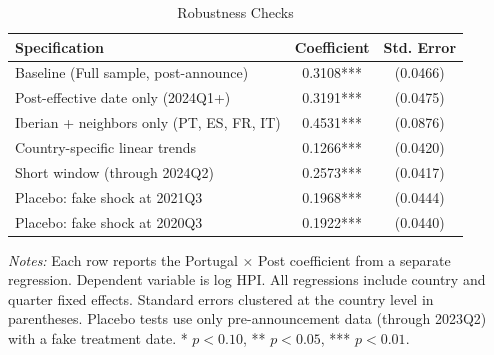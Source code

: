 \begin{table}[H]
\centering
\caption{Robustness Checks}
\begin{threeparttable}
\begin{tabular}{lcc}
\toprule
Specification & Coefficient & Std. Error \\
\midrule
Baseline (Full sample, post-announce) & 0.3108*** & (0.0466) \\
Post-effective date only (2024Q1+) & 0.3191*** & (0.0475) \\
Iberian + neighbors only (PT, ES, FR, IT) & 0.4531*** & (0.0876) \\
Country-specific linear trends & 0.1266*** & (0.0420) \\
Short window (through 2024Q2) & 0.2573*** & (0.0417) \\
Placebo: fake shock at 2021Q3 & 0.1968*** & (0.0444) \\
Placebo: fake shock at 2020Q3 & 0.1922*** & (0.0440) \\
\bottomrule
\end{tabular}
\begin{tablenotes}[flushleft]
\small
\item \textit{Notes:} Each row reports the Portugal $\times$ Post coefficient from a separate regression. Dependent variable is log HPI. All regressions include country and quarter fixed effects. Standard errors clustered at the country level in parentheses. Placebo tests use only pre-announcement data (through 2023Q2) with a fake treatment date. * $p<0.10$, ** $p<0.05$, *** $p<0.01$.
\end{tablenotes}
\end{threeparttable}
\label{tab:robust}
\end{table}

